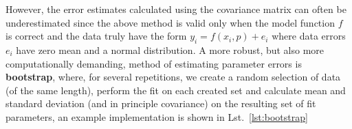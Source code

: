 However, the error estimates calculated using the covariance matrix can often be underestimated since the above method is valid only when the model function $f$ is correct and the data truly have the form $y_i = f(x_i, p) + e_i$ where data errors $e_i$ have zero mean and a normal distribution. A more robust, but also more computationally demanding, method of estimating parameter errors is \textbf{bootstrap}, where, for several repetitions, we create a random selection of data (of the same length), perform the fit on each created set and calculate mean and standard deviation (and in principle covariance) on the resulting set of fit parameters, an example implementation is shown in Lst.~\ref{lst:bootstrap}



